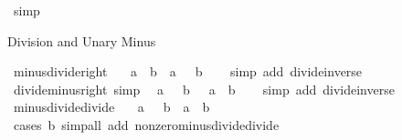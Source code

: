 \begin{isabellebody}
%
\isatagproof
{}\isamarkupfalse%
\ simp%
\endisatagproof
{\isafoldproof}%
%
\isadelimproof
%
\endisadelimproof
%
\begin{isamarkuptext}%
Division and Unary Minus%
\end{isamarkuptext}\isamarkuptrue%
\isamarkupfalse%
\ minus{\isacharunderscore}{\kern0pt}divide{\isacharunderscore}{\kern0pt}right{\isacharcolon}{\kern0pt}\isanewline
\ \ {\isachardoublequoteopen}{\isacharminus}{\kern0pt}\ {\isacharparenleft}{\kern0pt}a\ {\isacharslash}{\kern0pt}\ b{\isacharparenright}{\kern0pt}\ {\isacharequal}{\kern0pt}\ a\ {\isacharslash}{\kern0pt}\ {\isacharminus}{\kern0pt}\ b{\isachardoublequoteclose}\isanewline
%
\isadelimproof
\ \ %
\endisadelimproof
%
\isatagproof
{}\isamarkupfalse%
\ {\isacharparenleft}{\kern0pt}simp\ add{\isacharcolon}{\kern0pt}\ divide{\isacharunderscore}{\kern0pt}inverse{\isacharparenright}{\kern0pt}%
\endisatagproof
{\isafoldproof}%
%
\isadelimproof
\isanewline
%
\endisadelimproof
\isanewline
{}\isamarkupfalse%
\ divide{\isacharunderscore}{\kern0pt}minus{\isacharunderscore}{\kern0pt}right\ {\isacharbrackleft}{\kern0pt}simp{\isacharbrackright}{\kern0pt}{\isacharcolon}{\kern0pt}\isanewline
\ \ {\isachardoublequoteopen}a\ {\isacharslash}{\kern0pt}\ {\isacharminus}{\kern0pt}\ b\ {\isacharequal}{\kern0pt}\ {\isacharminus}{\kern0pt}\ {\isacharparenleft}{\kern0pt}a\ {\isacharslash}{\kern0pt}\ b{\isacharparenright}{\kern0pt}{\isachardoublequoteclose}\isanewline
%
\isadelimproof
\ \ %
\endisadelimproof
%
\isatagproof
{}\isamarkupfalse%
\ {\isacharparenleft}{\kern0pt}simp\ add{\isacharcolon}{\kern0pt}\ divide{\isacharunderscore}{\kern0pt}inverse{\isacharparenright}{\kern0pt}%
\endisatagproof
{\isafoldproof}%
%
\isadelimproof
\isanewline
%
\endisadelimproof
\isanewline
{}\isamarkupfalse%
\ minus{\isacharunderscore}{\kern0pt}divide{\isacharunderscore}{\kern0pt}divide{\isacharcolon}{\kern0pt}\isanewline
\ \ {\isachardoublequoteopen}{\isacharparenleft}{\kern0pt}{\isacharminus}{\kern0pt}\ a{\isacharparenright}{\kern0pt}\ {\isacharslash}{\kern0pt}\ {\isacharparenleft}{\kern0pt}{\isacharminus}{\kern0pt}\ b{\isacharparenright}{\kern0pt}\ {\isacharequal}{\kern0pt}\ a\ {\isacharslash}{\kern0pt}\ b{\isachardoublequoteclose}\isanewline
%
\isadelimproof
\ \ %
\endisadelimproof
%
\isatagproof
{}\isamarkupfalse%
\ {\isacharparenleft}{\kern0pt}cases\ {\isachardoublequoteopen}b{\isacharequal}{\kern0pt}{}{\isachardoublequoteclose}{\isacharparenright}{\kern0pt}\ {\isacharparenleft}{\kern0pt}simp{\isacharunderscore}{\kern0pt}all\ add{\isacharcolon}{\kern0pt}\ nonzero{\isacharunderscore}{\kern0pt}minus{\isacharunderscore}{\kern0pt}divide{\isacharunderscore}{\kern0pt}divide{\isacharparenright}{\kern0pt}%

\end{isabellebody}
